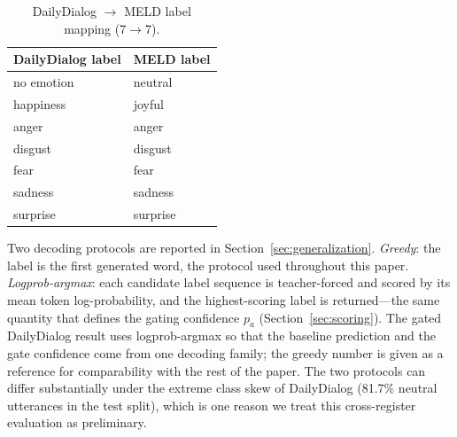 \documentclass[final,5p,times,twocolumn]{elsarticle}
\begin{document}
\begin{table}[h]
\centering
\caption{DailyDialog $\to$ MELD label mapping (7$\to$7).}
\label{tab:ddmap}
\small
\begin{tabular}{ll}
\toprule
DailyDialog label & MELD label \\
\midrule
no emotion & neutral \\
happiness & joyful \\
anger & anger \\
disgust & disgust \\
fear & fear \\
sadness & sadness \\
surprise & surprise \\
\bottomrule
\end{tabular}
\end{table}

Two decoding protocols are reported in
Section~\ref{sec:generalization}. \emph{Greedy}: the label is the first
generated word, the protocol used throughout this paper. \emph{Logprob-argmax}:
each candidate label sequence is teacher-forced and scored by its mean
token log-probability, and the highest-scoring label is returned---the same
quantity that defines the gating confidence $p_a$
(Section~\ref{sec:scoring}). The gated DailyDialog result uses
logprob-argmax so that the baseline prediction and the gate confidence come
from one decoding family; the greedy number is given as a reference for
comparability with the rest of the paper. The two protocols can differ
substantially under the extreme class skew of DailyDialog (81.7\% neutral
utterances in the test split), which is one reason we treat this
cross-register evaluation as preliminary.





\end{document}
